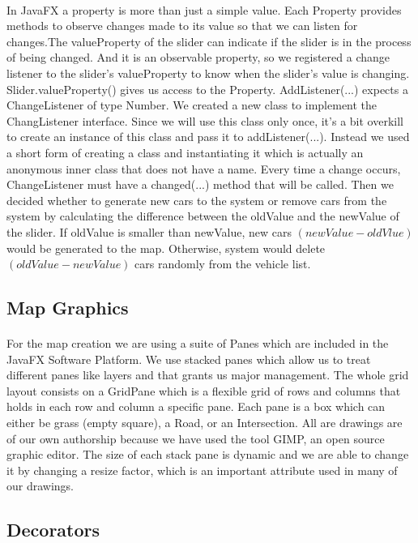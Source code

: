 \documentclass[a4paper,11pt,titlepage]{article}
\begin{document}
\paragraph{}
In JavaFX a property is more than just a simple value. Each Property provides methods to observe changes made to its value so that we can listen for changes.The valueProperty of the slider can indicate if the slider is in the process of being changed. And it is an observable property, so we registered a change listener to the slider's valueProperty to know when the slider's value is changing. Slider.valueProperty() gives us access to the Property. AddListener(...) expects a ChangeListener of type Number. We created a new class to implement the ChangListener interface. Since we will use this class only once, it's a bit overkill to create an instance of this class and pass it to addListener(...). Instead we used a short form of creating a class and instantiating it which is actually an anonymous inner class that does not have a name. Every time a change occurs, ChangeListener must have a changed(...) method that will be called. Then we decided whether to generate new cars to the system or remove cars from the system by calculating the difference between the oldValue and the newValue of the slider.
If oldValue is smaller than newValue, new cars $(newValue - oldVlue)$ would be generated to the map. Otherwise, system would delete $(oldValue - newValue)$ cars randomly from the vehicle list. 

\subsection{Map Graphics}
\paragraph{}
For the map creation we are using a suite of Panes which are included in the JavaFX Software Platform. We use stacked panes which allow us to treat different panes like layers and that grants us major management. The whole grid layout consists on a GridPane which is a flexible grid of rows and columns that holds in each row and column a specific pane. Each pane is a box which can either be grass (empty square), a Road, or an Intersection. All are drawings are of our own authorship because we have used the tool GIMP, an open source graphic editor. The size of each stack pane is dynamic and we are able to change it by changing a resize factor, which is an important attribute used in many of our drawings. 
\subsection{Decorators}
\end{document}
